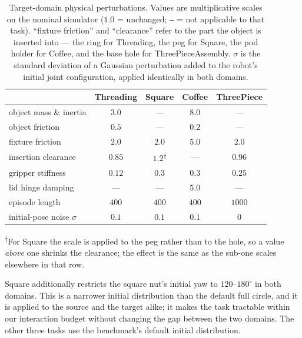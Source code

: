 \begin{table}[h]
\centering
\caption{Target-domain physical perturbations. Values are multiplicative scales
on the nominal simulator ($1.0$ = unchanged; \texttt{---} = not applicable to
that task). ``fixture friction'' and ``clearance'' refer to the part the object
is inserted into --- the ring for Threading, the peg for Square, the pod holder
for Coffee, and the base hole for ThreePieceAssembly. $\sigma$ is the standard
deviation of a Gaussian perturbation added to the robot's initial joint
configuration, applied identically in both domains.}
\label{tab:app-targets}
\small
\begin{tabular}{lcccc}
\toprule
 & Threading & Square & Coffee & ThreePiece \\
\midrule
object mass \& inertia      & $3.0$   & ---     & $8.0$   & ---     \\
object friction             & $0.5$   & ---     & $0.2$   & ---     \\
fixture friction            & $2.0$   & $2.0$   & $5.0$   & $2.0$   \\
insertion clearance         & $0.85$  & $1.2$\textsuperscript{$\dagger$} & --- & $0.96$ \\
gripper stiffness           & $0.12$  & $0.3$   & $0.3$   & $0.25$  \\
lid hinge damping           & ---     & ---     & $5.0$   & ---     \\
\midrule
episode length              & $400$   & $400$   & $400$   & $1000$  \\
initial-pose noise $\sigma$ & $0.1$   & $0.1$   & $0.1$   & $0$     \\
\bottomrule
\end{tabular}
\end{table}

\textsuperscript{$\dagger$}For Square the scale is applied to the peg rather
than to the hole, so a value \emph{above} one shrinks the clearance; the effect
is the same as the sub-one scales elsewhere in that row.

Square additionally restricts the square nut's initial yaw to $120$--$180^{\circ}$
in both domains. This is a narrower initial distribution than the default full
circle, and it is applied to the source and the target alike; it makes the task
tractable within our interaction budget without changing the gap between the two
domains. The other three tasks use the benchmark's default initial distribution.

